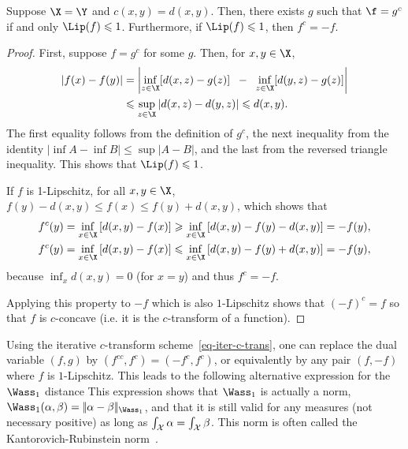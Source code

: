 \begin{prop}Suppose $\X=\Y$ and $c(x,y)=d(x,y)$. 
Then, there exists $g$ such that $\f = g^c$ if and only $\Lip(f) \leq 1$. 
Furthermore, if $\Lip(f)\leq1$, then $f^c=-f$.
\end{prop}

\begin{proof}
First, suppose $f=g^c$ for some $g$.  Then, for $x,y\in \X$,
\begin{align*}
|f(x)-f(y)|&=\left|\inf_{z\in\X} [d(x,z)-g(z)] \;\; - \;\;\inf_{z\in \X} [d(y,z)-g(z)] \right|\\
&\leq \sup_{z\in\X} |d(x,z)-d(y,z)|\leq d(x,y).
\end{align*}
The first equality follows from the definition of $g^c$, the next inequality from the identity $|\inf A-\inf B|\leq\sup|A-B|$, and the last from the reversed triangle inequality. This shows that $\Lip(f)\leq1$.

If $f$ is 1-Lipschitz, for all $x,y\in\X$, $f(y)-d(x,y)\leq f(x)\leq f(y)+d(x,y)$, which shows that 
\begin{align*}
f^c(y)&=\inf_{x\in\X}\left[ d(x,y) - f(x) \right]
\geq\inf_{x\in \X} \left[  d(x,y)-f(y)-d(x,y)\right]=-f(y),\\
f^c(y)&=\inf_{x\in\X}\left[ d(x,y) - f(x) \right]
\leq \inf_{x\in\X}\left[ d(x,y) - f(y)+d(x,y) \right]=-f(y), 
\end{align*}
because $\inf_x d(x,y) = 0$ (for $x=y$) and thus $f^c=-f$. 

Applying this property to $-f$ which is also $1$-Lipschitz shows that $(-f)^c = f$ so that $f$ is $c$-concave (i.e. it is the $c$-transform of a function). 
\end{proof}

Using the iterative $c$-transform scheme~\eqref{eq-iter-c-trans}, one can replace the dual variable $(f,g)$ by $(f^{cc},f^{c})=(-f^c, f^{c})$, or equivalently by any pair $(f,-f)$ where $f$ is $1$-Lipschitz. 
%
This leads to the following alternative expression for the $\Wass_1$ distance
This expression shows that $\Wass_1$ is actually a norm, \ie $\Wass_1(\al,\be) = \norm{\al-\be}_{\Wass_1}$, and that it is still valid for any measures (not necessary positive) as long as $\int_{\mathcal{X}} \alpha=\int_{\mathcal{X}} \beta$. This norm is often called the Kantorovich-Rubinstein norm~\cite{kantorovich1958space}.


